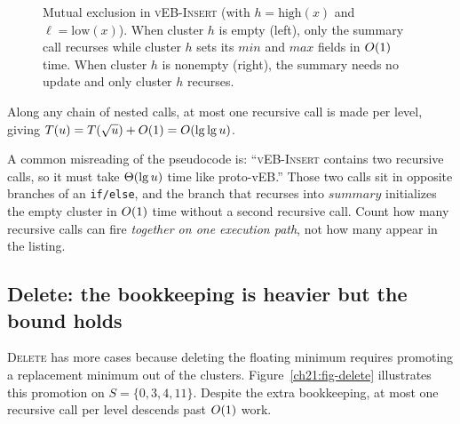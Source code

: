 \begin{figure}[htbp]
\caption{Mutual exclusion in \textsc{vEB-Insert} (with $h = \mathrm{high}(x)$ and $\ell = \mathrm{low}(x)$). When cluster $h$ is empty (left), only the summary call recurses while cluster $h$ sets its $\mathit{min}$ and $\mathit{max}$ fields in $O(1)$ time. When cluster $h$ is nonempty (right), the summary needs no update and only cluster $h$ recurses.}
\label{ch21:fig-insert-cases}
\end{figure}

Along any chain of nested calls, at most one recursive call is made per level, giving
$T(u) = T(\sqrt{u}) + O(1) = O(\lg\lg u)$.

\begin{trapbox}
A common misreading of the pseudocode is: ``\textsc{vEB-Insert} contains two recursive calls, so it must take
$\Theta(\lg u)$ time like proto-vEB.'' Those two calls sit in opposite
branches of an \texttt{if/else}, and the branch that recurses into $\mathit{summary}$ initializes the empty cluster in $O(1)$ time without a second recursive call. Count how many recursive calls can fire \emph{together on one execution path}, not how many appear in the listing.
\end{trapbox}

\subsection{Delete: the bookkeeping is heavier but the bound holds}

\textsc{Delete} has more cases because deleting the floating minimum requires promoting a replacement minimum out of the clusters. Figure~\ref{ch21:fig-delete} illustrates this promotion on $S = \{0, 3, 4, 11\}$. Despite the extra bookkeeping, at most one recursive call per level descends past $O(1)$ work.

